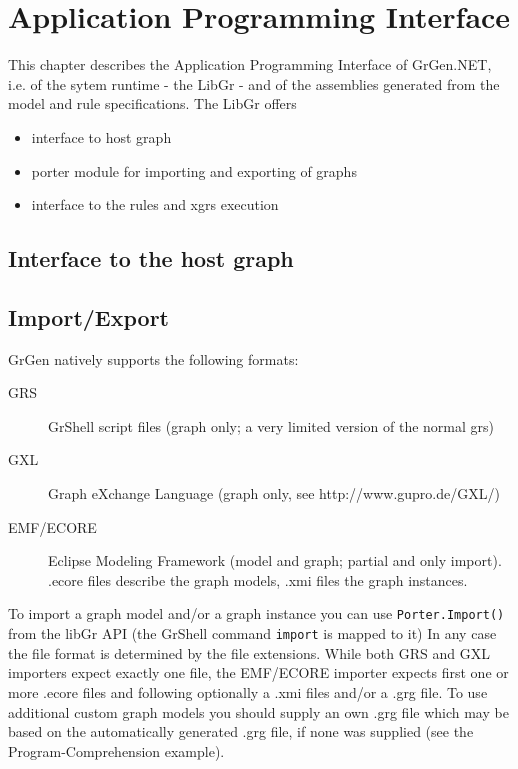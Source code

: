 \chapter{Application Programming Interface}
\label{chapapi}

This chapter describes the Application Programming Interface of GrGen.NET, i.e. of the sytem runtime - the LibGr - and of the assemblies generated from the model and rule specifications.
The LibGr offers
\begin{itemize}
\item interface to host graph
\item porter module for importing and exporting of graphs
\item interface to the rules and xgrs execution
\end{itemize}

\section{Interface to the host graph}

\section{Import/Export}\label{sub:imexport}

GrGen natively supports the following formats:
\begin{description}
  \item[GRS] GrShell script files (graph only; a very limited version of the normal grs)
  \item[GXL] Graph eXchange Language (graph only, see http://www.gupro.de/GXL/)
  \item[EMF/ECORE] Eclipse Modeling Framework (model and graph; partial and only import).
      .ecore files describe the graph models, .xmi files the graph instances.
\end{description}

To import a graph model and/or a graph instance you can use
\verb#Porter.Import()# from the libGr API (the GrShell command \verb#import# is mapped to it)
In any case the file format is determined by the file extensions.
While both GRS and GXL importers expect exactly one file, the EMF/ECORE importer
expects first one or more .ecore files and following optionally a .xmi files and/or
a .grg file. To use additional custom graph models you should supply an own .grg
file which may be based on the automatically generated .grg file, if none was
supplied (see the Program-Comprehension example).

